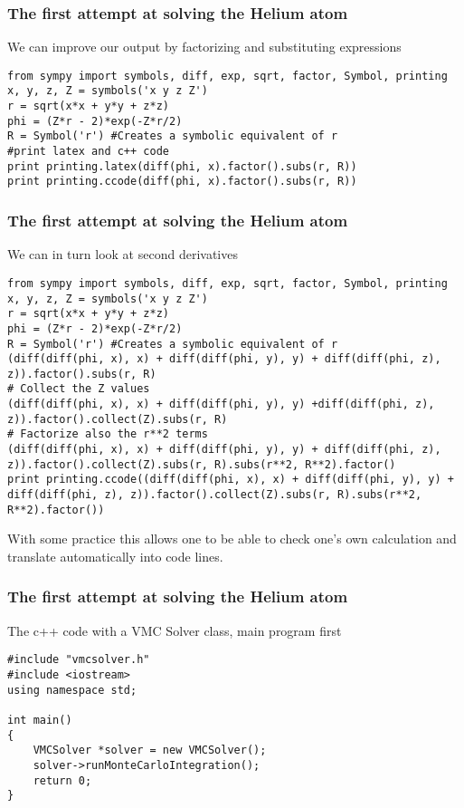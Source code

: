 \documentclass{beamer}
\begin{document}
\begin{frame}
\frametitle{The first attempt at solving the Helium atom}

\begin{block}{}
We can improve our output by factorizing and substituting expressions
\begin{verbatim}
from sympy import symbols, diff, exp, sqrt, factor, Symbol, printing
x, y, z, Z = symbols('x y z Z')
r = sqrt(x*x + y*y + z*z)
phi = (Z*r - 2)*exp(-Z*r/2)
R = Symbol('r') #Creates a symbolic equivalent of r
#print latex and c++ code
print printing.latex(diff(phi, x).factor().subs(r, R))
print printing.ccode(diff(phi, x).factor().subs(r, R))
\end{verbatim}
\end{block}
\end{frame}

\begin{frame}
\frametitle{The first attempt at solving the Helium atom}

\begin{block}{}
We can in turn look at second derivatives
\begin{verbatim}
from sympy import symbols, diff, exp, sqrt, factor, Symbol, printing
x, y, z, Z = symbols('x y z Z')
r = sqrt(x*x + y*y + z*z)
phi = (Z*r - 2)*exp(-Z*r/2)
R = Symbol('r') #Creates a symbolic equivalent of r
(diff(diff(phi, x), x) + diff(diff(phi, y), y) + diff(diff(phi, z), z)).factor().subs(r, R)
# Collect the Z values
(diff(diff(phi, x), x) + diff(diff(phi, y), y) +diff(diff(phi, z), z)).factor().collect(Z).subs(r, R)
# Factorize also the r**2 terms
(diff(diff(phi, x), x) + diff(diff(phi, y), y) + diff(diff(phi, z), z)).factor().collect(Z).subs(r, R).subs(r**2, R**2).factor()
print printing.ccode((diff(diff(phi, x), x) + diff(diff(phi, y), y) + diff(diff(phi, z), z)).factor().collect(Z).subs(r, R).subs(r**2, R**2).factor())
\end{verbatim}
With some practice this allows one to be able to check one's own calculation and translate automatically into code lines.
\end{block}
\end{frame}

\begin{frame}
\frametitle{The first attempt at solving the Helium atom}

\begin{block}{The c++ code with a VMC Solver class, main program first }

\begin{verbatim}
#include "vmcsolver.h"
#include <iostream>
using namespace std;

int main()
{
    VMCSolver *solver = new VMCSolver();
    solver->runMonteCarloIntegration();
    return 0;
}
\end{verbatim}
\end{block}
\end{frame}
\end{document}
